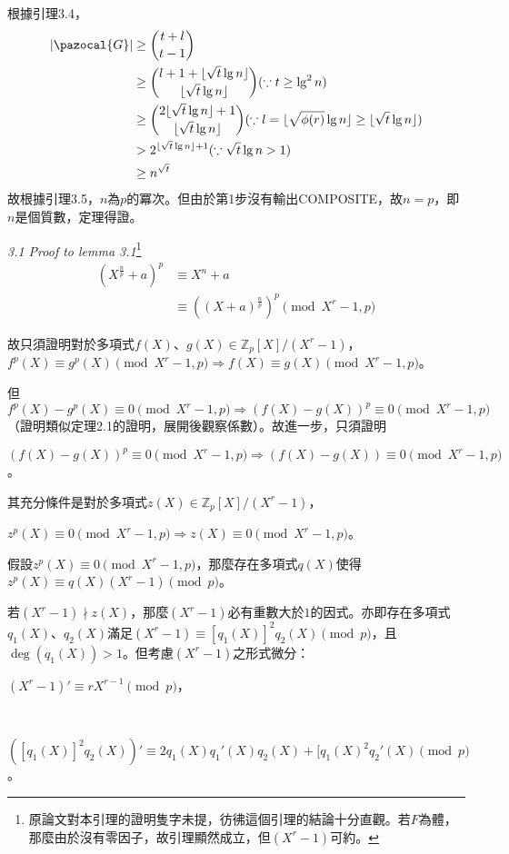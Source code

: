 \documentclass{article}
\DeclarePairedDelimiter\floor{\lfloor}{\rfloor}
\newcommand{\Gc}{\pazocal{G}}
\begin{document}
    根據引理3.4，
        \begin{align*}
        |\Gc| &\geq \binom{t+l}{t-1}\\
              &\geq \binom{l+1+\floor{\sqrt{t}\lg n}}{\floor{\sqrt{t}\lg n}}(\because t\geq \lg^2n)\\
              &\geq \binom{2\floor{\sqrt{t}\lg n}+1}{\floor{\sqrt{t}\lg n}}(\because l=\floor{\sqrt{\phi(r)}\lg n}\geq\floor{\sqrt{t}\lg n})\\
              &> 2^{\floor{\sqrt{t}\lg n}+1}(\because \sqrt{t}\lg n>1)\\
              &\geq n^{\sqrt{t}}
        \end{align*}
    故根據引理3.5，$n$為$p$的冪次。但由於第1步沒有輸出COMPOSITE，故$n=p$，即$n$是個質數，定理得證。

 \vspace{12pt} 

\noindent\textit{3.1 Proof to lemma 3.1}\footnote{原論文對本引理的證明隻字未提，彷彿這個引理的結論十分直觀。若$F$為體，那麼由於沒有零因子，故引理顯然成立，但$(X^r-1)$可約。}
    \begin{align*}
    (X^{\frac{n}{p}}+a)^p&\equiv X^n+a\\
                         &\equiv ((X+a)^{\frac{n}{p}})^p\pmod{X^r-1,p}
    \end{align*}

    故只須證明對於多項式$f(X)$、$g(X)\in \mathbb{Z}_{p}[X]/(X^r-1)$，$f^p(X)\equiv g^p(X)\pmod{X^r-1,p}\Rightarrow f(X)\equiv g(X)\pmod{X^r-1,p}$。

    但$f^p(X)-g^p(X)\equiv 0\pmod{X^r-1,p}\Rightarrow (f(X)-g(X))^p\equiv 0\pmod{X^r-1,p}$（證明類似定理2.1的證明，展開後觀察係數）。故進一步，只須證明\\
        \centerline{$(f(X)-g(X))^p\equiv 0\pmod{X^r-1,p}\Rightarrow(f(X)-g(X))\equiv 0\pmod{X^r-1,p}$。}
        
    其充分條件是對於多項式$z(X)\in\mathbb{Z}_{p}[X]/(X^r-1)$，\\
        \centerline{$z^p(X)\equiv 0\pmod{X^r-1,p}\Rightarrow z(X)\equiv 0\pmod{X^r-1,p}$。}

    假設$z^p(X)\equiv 0\pmod{X^r-1,p}$，那麼存在多項式$q(X)$使得$z^p(X)\equiv q(X)(X^r-1)\pmod{p}$。
    
    若$(X^r-1)\nmid z(X)$，那麼$(X^r-1)$必有重數大於$1$的因式。亦即存在多項式$q_1(X)$、$q_2(X)$滿足$(X^r-1)\equiv [q_1(X)]^2q_2(X)\pmod{p}$，且$\deg(q_1(X))>1$。但考慮$(X^r-1)$之形式微分：\\
        \centerline{$(X^r-1)'\equiv rX^{r-1}\pmod{p}$，}\\
        \centerline{$([q_1(X)]^2q_2(X))'\equiv 2q_1(X)q_1'(X)q_2(X)+[q_1(X)^2q_2'(X)\pmod{p}$。}
        
\end{document}
